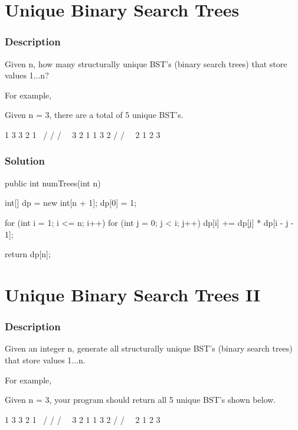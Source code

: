 \section{Unique Binary Search Trees} %

\subsubsection{Description}
Given n, how many structurally unique BST's (binary search trees) that store values 1...n?

For example,

Given n = 3, there are a total of 5 unique BST's.
\begin{Code}
   1         3     3      2      1
    \       /     /      / \      \
     3     2     1      1   3      2
    /     /       \                 \
   2     1         2                 3
\end{Code}

\subsubsection{Solution}

\begin{Code}
public int numTrees(int n) {
    int[] dp = new int[n + 1];
    dp[0] = 1;

    for (int i = 1; i <= n; i++) {
        for (int j = 0; j < i; j++) {
            dp[i] += dp[j] * dp[i - j - 1];
        }
    }

    return dp[n];
}
\end{Code}

\newpage

\section{Unique Binary Search Trees II} %

\subsubsection{Description}
Given an integer n, generate all structurally unique BST's (binary search trees) that store values 1...n.

For example,

Given n = 3, your program should return all 5 unique BST's shown below.
\begin{Code}
   1         3     3      2      1
    \       /     /      / \      \
     3     2     1      1   3      2
    /     /       \                 \
   2     1         2                 3
\end{Code}

